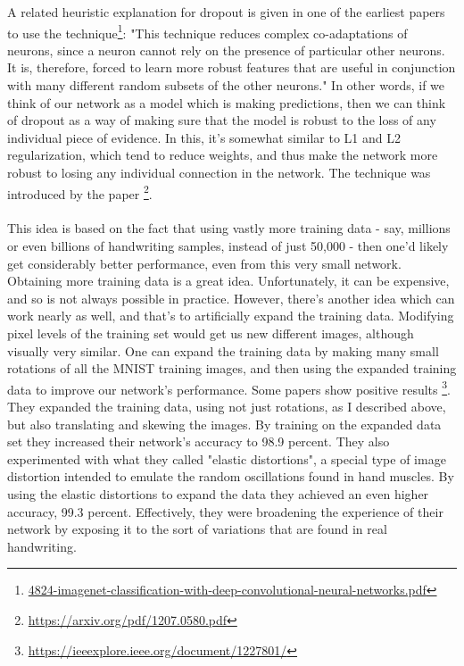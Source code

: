 A related heuristic explanation for dropout is given in one of the earliest papers to use the technique\footnote{\href{https://papers.nips.cc/paper/4824-imagenet-classification-with-deep-convolutional-neural-networks.pdf}{4824-imagenet-classification-with-deep-convolutional-neural-networks.pdf}}: "This technique reduces complex co-adaptations of neurons, since a neuron cannot rely on the presence of particular other neurons. It is, therefore, forced to learn more robust features that are useful in conjunction with many different random subsets of the other neurons." In other words, if we think of our network as a model which is making predictions, then we can think of dropout as a way of making sure that the model is robust to the loss of any individual piece of evidence. In this, it's somewhat similar to L1 and L2 regularization, which tend to reduce weights, and thus make the network more robust to losing any individual connection in the network. The technique was introduced by the paper \footnote{\url{https://arxiv.org/pdf/1207.0580.pdf}}.


\paragraph{} This idea is based on the fact that using vastly more training data - say, millions or even billions of handwriting samples, instead of just 50,000 - then one'd likely get considerably better performance, even from this very small network. Obtaining more training data is a great idea. Unfortunately, it can be expensive, and so is not always possible in practice. However, there's another idea which can work nearly as well, and that's to artificially expand the training data. Modifying pixel levels of the training set would get us new different images, although visually very similar. One can expand the training data by making many small rotations of all the MNIST training images, and then using the expanded training data to improve our network's performance. Some papers show positive results \footnote{\url{https://ieeexplore.ieee.org/document/1227801/}}. They expanded the training data, using not just rotations, as I described above, but also translating and skewing the images. By training on the expanded data set they increased their network's accuracy to 98.9 percent. They also experimented with what they called "elastic distortions", a special type of image distortion intended to emulate the random oscillations found in hand muscles. By using the elastic distortions to expand the data they achieved an even higher accuracy, 99.3 percent. Effectively, they were broadening the experience of their network by exposing it to the sort of variations that are found in real handwriting.

